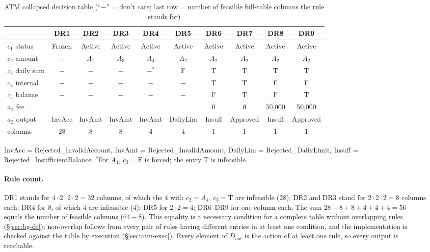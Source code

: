 \documentclass[11pt,a4paper]{article}
\begin{document}
\begin{table}[H]
\centering
\caption{ATM collapsed decision table (``\(-\)'' = don't care; last row = number of feasible full-table columns the rule stands for)}
\label{tab:atm-dt}
\small
\setlength{\tabcolsep}{4pt}
\begin{tabular}{l ccccccccc}
\toprule
 & DR1 & DR2 & DR3 & DR4 & DR5 & DR6 & DR7 & DR8 & DR9 \\
\midrule
\(c_1\) status & Frozen & Active & Active & Active & Active & Active & Active & Active & Active \\
\(c_2\) amount & \(-\) & \(A_1\) & \(A_3\) & \(A_4\) & \(A_2\) & \(A_2\) & \(A_2\) & \(A_2\) & \(A_2\) \\
\(c_3\) daily sum & \(-\) & \(-\) & \(-\) & \(-\)\(^{*}\) & F & T & T & T & T \\
\(c_4\) internal & \(-\) & \(-\) & \(-\) & \(-\) & \(-\) & T & T & F & F \\
\(c_5\) balance & \(-\) & \(-\) & \(-\) & \(-\) & \(-\) & F & T & F & T \\
\midrule
\(a_1\) fee & & & & & & 0 & 0 & 50{,}000 & 50{,}000 \\
\(a_2\) output & InvAcc & InvAmt & InvAmt & InvAmt & DailyLim & Insuff & Approved & Insuff & Approved \\
\midrule
columns & 28 & 8 & 8 & 4 & 4 & 1 & 1 & 1 & 1 \\
\bottomrule
\end{tabular}

\smallskip
\footnotesize InvAcc = Rejected\_InvalidAccount, InvAmt = Rejected\_InvalidAmount,
DailyLim = Rejected\_DailyLimit, Insuff = Rejected\_InsufficientBalance.
\(^{*}\)For \(A_4\), \(c_3=\mathrm{F}\) is forced; the entry T is infeasible.
\end{table}

\paragraph{Rule count.} DR1 stands for \(4\cdot2\cdot2\cdot2=32\) columns,
of which the \(4\) with \(c_2=A_4\), \(c_3=\mathrm{T}\) are infeasible
(\(28\)); DR2 and DR3 stand for \(2\cdot2\cdot2=8\) columns each; DR4 for
\(8\), of which \(4\) are infeasible (\(4\)); DR5 for \(2\cdot2=4\); DR6--DR9
for one column each. The sum \(28+8+8+4+4+4=56\) equals the number of
feasible columns (\(64-8\)). This equality is a necessary condition for a
complete table without overlapping rules (\S\ref{sec:bg-dt}); non-overlap
follows from every pair of rules having different entries in at least one
condition, and the implementation is checked against the table by execution
(\S\ref{sec:atm-exec}). Every element of \(D_{out}\) is the action of at
least one rule, so every output is reachable.
\end{document}
